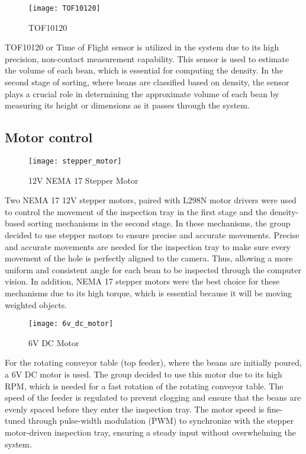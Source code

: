 \begin{figure}[h]
    \centering
    \texttt{[image: TOF10120]} %
    \caption{TOF10120}
    \label{fig:tof10120}
\end{figure}

TOF10120 or Time of Flight sensor is utilized in the system due to its high precision, non-contact measurement capability. This sensor is used to estimate the volume of each bean, which is essential for computing the density. In the second stage of sorting, where beans are classified based on density, the sensor plays a crucial role in determining the approximate volume of each bean by measuring its height or dimensions as it passes through the system.

\subsection{Motor control}

\begin{figure}[h]
    \centering
    \texttt{[image: stepper\_motor]} %
    \caption{12V NEMA 17 Stepper Motor}
    \label{fig:stepper_motor}
\end{figure}

Two NEMA 17 12V stepper motors, paired with L298N motor drivers were used to control the movement of the inspection tray in the first stage and the density-based sorting mechanisms in the second stage. In these mechanisms, the group decided to use stepper motors to ensure precise and accurate movements. Precise and accurate movements are needed for the inspection tray to make sure every movement of the hole is perfectly aligned to the camera. Thus, allowing a more uniform and consistent angle for each bean to be inspected through the computer vision. In addition, NEMA 17 stepper motors were the best choice for these mechanisms due to its high torque, which is essential because it will be moving weighted objects. 

\begin{figure}[h]
    \centering
    \texttt{[image: 6v\_dc\_motor]} %
    \caption{6V DC Motor}
    \label{fig:6v_dc_motor}
\end{figure}

For the rotating conveyor table (top feeder), where the beans are initially poured, a 6V DC motor is used. The group decided to use this motor due to its high RPM, which is needed for a fast rotation of the rotating conveyor table. The speed of the feeder is regulated to prevent clogging and ensure that the beans are evenly spaced before they enter the inspection tray. The motor speed is fine-tuned through pulse-width modulation (PWM) to synchronize with the stepper motor-driven inspection tray, ensuring a steady input without overwhelming the system.

